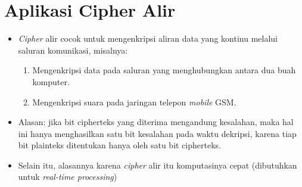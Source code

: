 \documentclass{article}
\begin{document}

\section*{Aplikasi Cipher Alir}

\begin{itemize}
    \item \textit{Cipher} alir cocok untuk mengenkripsi aliran data yang kontinu melalui saluran komunikasi, misalnya:
    \begin{enumerate}
        \item Mengenkripsi data pada saluran yang menghubungkan antara dua buah komputer.
        \item Mengenkripsi suara pada jaringan telepon \textit{mobile} GSM.
    \end{enumerate}
    \item Alasan: jika bit cipherteks yang diterima mengandung kesalahan, maka hal ini hanya menghasilkan satu bit kesalahan pada waktu dekripsi, karena tiap bit plainteks ditentukan hanya oleh satu bit cipherteks.
    \item Selain itu, alasannya karena \textit{cipher} alir itu komputasinya cepat (dibutuhkan untuk \textit{real-time processing})
    \end{itemize}
\end{document}

